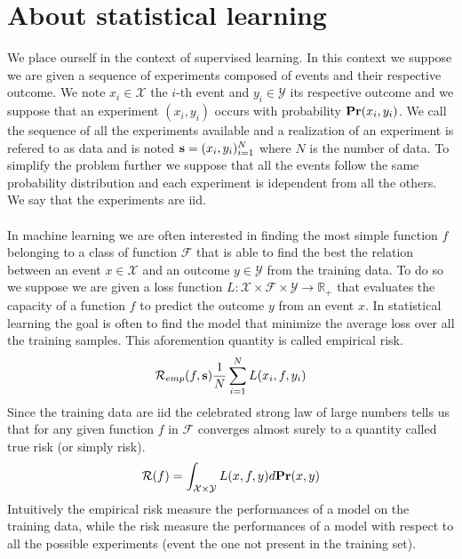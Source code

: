
\section{About statistical learning}
\label{sec:about_statistical_learning}
We place ourself in the context of supervised learning. In this context we
suppose we are given a sequence of experiments composed of events and their
respective outcome. We note $x_i\in\mathcal{X}$ the $i$-th event and
$y_i\in\mathcal{Y}$ its respective outcome and we suppose that an experiment
$(x_i, y_i)$ occurs with probability ${\mathbf{{Pr}}}(x_i, y_i)$. We call the
sequence of all the experiments available  and a realization
of an experiment is refered to as data and is noted $\boldsymbol{\mathbf{s}}=(x_i,
y_i)_{i=1}^N$ where $N$ is the number of data. To simplify the problem further
we suppose that all the events follow the same probability distribution and
each experiment is idependent from all the others. We say that the experiments
are \acf{iid}.
\paragraph{}
In machine learning we are often interested in finding the most simple function
$f$ belonging to a class of function $\mathcal{F}$ that is able to find the
best the relation between an event $x\in\mathcal{X}$ and an outcome
$y\in\mathcal{Y}$ from the training data. To do so we suppose we are given a
loss function $L:\mathcal{X}\times\mathcal{F}\times\mathcal{Y} \to
\mathbb{R}_+$ that evaluates the capacity of a function $f$ to predict the
outcome $y$ from an event $x$. 
In statistical learning the goal is often to find the model that minimize the
average loss over all the training samples. This aforemention quantity is
called empirical risk.
\begin{dmath*}
    \mathcal{R}_{emp}(f, \seq{s}) \frac{1}{N}\sum_{i=1}^N L(x_i, f, y_i)
\end{dmath*}
Since the training data are \acs{iid} the celebrated strong law of large
numbers tells us that for any given function $f$ in $\mathcal{F}$ converges
almost surely to a quantity called true risk (or simply risk).
\begin{dmath*}
    \mathcal{R}(f) = \int_{\mathcal{X}\times\mathcal{Y}} L(x, f, y)
    d\probability(x, y)
\end{dmath*}
Intuitively the empirical risk measure the performances of a model on the
training data, while the risk measure the performances of a model with respect
to all the possible experiments (event the one not present in the training
set).
